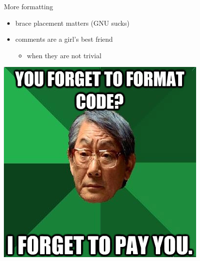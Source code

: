 \documentclass{beamer}
\begin{document}
\begin{frame}{More formatting}
  \begin{itemize}
    \pause
    \item brace placement matters \pause (GNU sucks)
    \pause
    \item comments are a girl's best friend
    \pause
    \begin{itemize}
      \item when they are not trivial
    \end{itemize}
    \pause
  \end{itemize}
  \begin{center}
    \includegraphics[scale=0.4]{asian}
  \end{center}
\end{frame}
\end{document}
